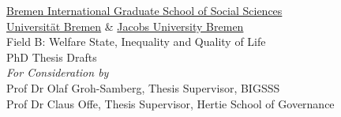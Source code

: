 
\begin{titlepage}

\centering

\thispagestyle{empty}

\vspace*{\fill}

	{\Large \href{http://www.bigsss-bremen.de}{Bremen International Graduate School of Social Sciences}}
	\\
	{\Large \href{http://www.uni-bremen.de}{Universität Bremen} \& \href{http://www.jacobs-university.de}{Jacobs University Bremen}}
	\\
	\vspace{15pt}
	{\Large Field B: Welfare State, Inequality and Quality of Life}
	\\
	\vspace{50pt}
	{\Large PhD Thesis Drafts}
	\\
	\vspace{30pt}
	{\Large \emph{For Consideration by}}
	\\
	\vspace{30pt}
	{\large Prof Dr Olaf Groh-Samberg, Thesis Supervisor, BIGSSS}
	\\
	\vspace{10pt}
	{\large Prof Dr Claus Offe, Thesis Supervisor, Hertie School of Governance}
	\\
	\vspace{30pt}

\vspace*{\fill}

\end{titlepage}